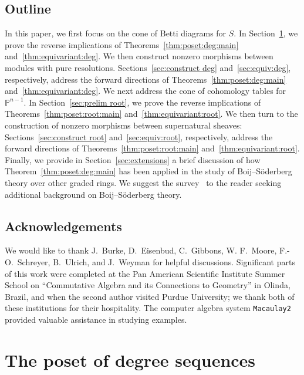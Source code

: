 \documentclass[12pt]{amsart}
\theoremstyle{definition}
\newcommand{\PP}{\mathbb{P}}
\begin{document}
\subsection*{Outline}%
In this paper, we first focus on the cone of Betti diagrams for $S$. 
In Section~\ref{sec:prelim deg}, we prove the reverse implications of 
Theorems~\ref{thm:poset:deg:main} and~\ref{thm:equivariant:deg}. 
We then construct nonzero morphisms 
between modules with pure resolutions. 
Sections~\ref{sec:construct deg} and~\ref{sec:equiv:deg}, 
respectively, address the forward directions of 
Theorems~\ref{thm:poset:deg:main} and~\ref{thm:equivariant:deg}.
%
We next address the cone of cohomology tables for $\PP^{n-1}$. 
In Section~\ref{sec:prelim root}, we prove the reverse
implications of Theorems~\ref{thm:poset:root:main}
and~\ref{thm:equivariant:root}.  We then turn to the construction of
nonzero morphisms between supernatural sheaves:
Sections~\ref{sec:construct root} and~\ref{sec:equiv:root},
respectively, address the forward directions of
Theorems~\ref{thm:poset:root:main} and~\ref{thm:equivariant:root}.
%
Finally, we provide in Section~\ref{sec:extensions} 
a brief discussion of how Theorem~\ref{thm:poset:deg:main} has been 
applied in the study of Boij--S\"oderberg theory over other graded rings.
%
We suggest the survey~\cite{ES:ICMsurvey}  
to the reader seeking additional background on Boij--S\"oderberg theory. 

\subsection*{Acknowledgements}%
We would like to thank J.~Burke, D.~Eisenbud, C.~Gibbons, W. F.~Moore, F.-O.~Schreyer, B.~Ulrich, and J.~Weyman
for helpful discussions. Significant parts of this work were completed
at the Pan American Scientific Institute Summer School on
``Commutative Algebra and its Connections to Geometry'' in Olinda,
Brazil, and when the second author visited Purdue University; we thank
both of these institutions for their hospitality.  The computer
algebra system \texttt{Macaulay2} \cite{M2} provided valuable
assistance in studying examples. 

\section{The poset of degree sequences}%
\label{sec:prelim deg}
\end{document}
